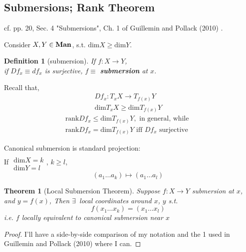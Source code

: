 \documentclass[10pt]{amsart}
\newtheorem{theorem}{Theorem}
\newtheorem{definition}{Definition}
\begin{document}
\begin{multicols*}{2}
\section{Submersions; Rank Theorem} 
cf. pp. 20, Sec. 4 "Submersions", Ch. 1 of Guillemin and Pollack (2010) \cite{VGuilleminAPollack2010}.  

Consider $X,Y\in \text{\textbf{Man}}$, s.t. $\text{dim}X \geq \text{dim}Y$.  

\begin{definition}[submersion] If $f:X\to Y$, \\
if $Df_x \equiv df_x$ is \emph{surjective}, $f\equiv $ \textbf{submersion} at $x$.
\end{definition}
Recall that,  
\[
\begin{gathered}
	Df_x:T_xX \to T_{f(x)}Y \\
	\text{dim}T_xX \geq \text{dim}T_{f(x)}Y
\end{gathered}
\]
\[
\begin{gathered}
\text{rank}Df_x \leq \text{dim}T_{f(x)}Y, \text{ in general, while } \\
\text{rank}Df_x = \text{dim}T_{f(x)}Y \text{ iff } Df_x \text{ surjective }
\end{gathered}
\]

Canonical submersion is standard projection: \\
If $\begin{gathered} \quad \\
\text{dim}X = k \\
\text{dim}Y = l \end{gathered}$, $k\geq l$, 
\[
(a_1 \dots a_k ) \mapsto (a_1 \dots a_l)
\]

\begin{theorem}[Local Submersion Theorem]\label{Thm:LocalSubmersion}
	Suppose $f:X\to Y$ submersion at $x$, and $y = f(x)$, 
	Then $\exists \, $ local coordinates around $x$, $y$ s.t. 
	\[
	f(x_1\dots x_k) = (x_1 \dots x_l)
	\]
	i.e. $f$ locally equivalent to canonical submersion near $x$
\end{theorem}
\begin{proof}
I'll have a side-by-side comparison of my notation and the 1 used in Guillemin and Pollack (2010) \cite{VGuilleminAPollack2010} where I can.	


\end{proof}
\end{multicols*}
\end{document}
